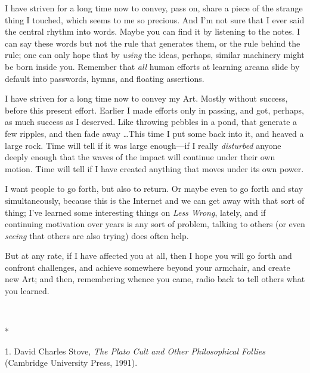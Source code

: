 {
 I have striven for a long time now to convey, pass on, share a
piece of the strange thing I touched, which seems to me so precious.
And I'm not sure that I ever said the central rhythm
into words. Maybe you can find it by listening to the notes. I can say
these words but not the rule that generates them, or the rule behind
the rule; one can only hope that by \textit{using} the ideas, perhaps,
similar machinery might be born inside you. Remember that \textit{all}
human efforts at learning arcana slide by default into passwords,
hymns, and floating assertions.}

{
 I have striven for a long time now to convey my Art. Mostly
without success, before this present effort. Earlier I made efforts
only in passing, and got, perhaps, as much success as I deserved. Like
throwing pebbles in a pond, that generate a few ripples, and then fade
away \ldots This time I put some back into it, and heaved a large rock.
Time will tell if it was large enough---if I really \textit{disturbed}
anyone deeply enough that the waves of the impact will continue under
their own motion. Time will tell if I have created anything that moves
under its own power.}

{
 I want people to go forth, but also to return. Or maybe even to go
forth and stay simultaneously, because this is the Internet and we can
get away with that sort of thing; I've learned some
interesting things on \textit{Less Wrong}, lately, and if continuing
motivation over years is any sort of problem, talking to others (or
even \textit{seeing} that others are also trying) does often help.}

{
 But at any rate, if I have affected you at all, then I hope you
will go forth and confront challenges, and achieve somewhere beyond
your armchair, and create new Art; and then, remembering whence you
came, radio back to tell others what you learned.}

{\centering
 \ ~
\par}

{\centering
 *
\par}


\bigskip

{
 1. David Charles Stove, \textit{The Plato Cult and Other
Philosophical Follies} (Cambridge University Press, 1991).}

